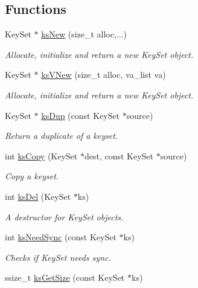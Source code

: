 \subsection*{Functions}
\begin{DoxyCompactItemize}
\item 
Key\+Set $\ast$ \hyperlink{group__keyset_ga671e1aaee3ae9dc13b4834a4ddbd2c3c}{ks\+New} (size\+\_\+t alloc,...)
\begin{DoxyCompactList}\small\item\em Allocate, initialize and return a new Key\+Set object. \end{DoxyCompactList}\item 
Key\+Set $\ast$ \hyperlink{group__keyset_ga4ff760f56693b51ab785ed7ce628e649}{ks\+V\+New} (size\+\_\+t alloc, va\+\_\+list va)
\begin{DoxyCompactList}\small\item\em Allocate, initialize and return a new Key\+Set object. \end{DoxyCompactList}\item 
Key\+Set $\ast$ \hyperlink{group__keyset_gac59e4b328245463f1451f68d5106151c}{ks\+Dup} (const Key\+Set $\ast$source)
\begin{DoxyCompactList}\small\item\em Return a duplicate of a keyset. \end{DoxyCompactList}\item 
int \hyperlink{group__keyset_gaba1f1dbea191f4d7e7eb3e4296ae7d5e}{ks\+Copy} (Key\+Set $\ast$dest, const Key\+Set $\ast$source)
\begin{DoxyCompactList}\small\item\em Copy a keyset. \end{DoxyCompactList}\item 
int \hyperlink{group__keyset_ga27e5c16473b02a422238c8d970db7ac8}{ks\+Del} (Key\+Set $\ast$ks)
\begin{DoxyCompactList}\small\item\em A destructor for Key\+Set objects. \end{DoxyCompactList}\item 
int \hyperlink{group__keyset_ga8f210432e664d8ba06d7d55a2aba2d0f}{ks\+Need\+Sync} (const Key\+Set $\ast$ks)
\begin{DoxyCompactList}\small\item\em Checks if Key\+Set needs sync. \end{DoxyCompactList}\item 
ssize\+\_\+t \hyperlink{group__keyset_ga7474ad6b0a0fa969dbdf267ba5770eee}{ks\+Get\+Size} (const Key\+Set $\ast$ks)

\end{DoxyCompactItemize}
